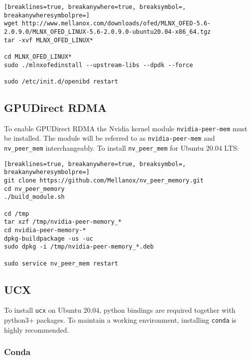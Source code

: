 \documentclass[a4paper,onecolumn]{article}
\begin{document}
\begin{Verbatim}[breaklines=true, breakanywhere=true, breaksymbol=, breakanywheresymbolpre=]
wget http://www.mellanox.com/downloads/ofed/MLNX_OFED-5.6-2.0.9.0/MLNX_OFED_LINUX-5.6-2.0.9.0-ubuntu20.04-x86_64.tgz
tar -xvf MLNX_OFED_LINUX*

cd MLNX_OFED_LINUX*
sudo ./mlnxofedinstall --upstream-libs --dpdk --force

sudo /etc/init.d/openibd restart
\end{Verbatim}

\subsection{GPUDirect RDMA}

To enable GPUDirect RDMA the Nvidia kernel module \verb|nvidia-peer-mem| must be installed. The module will be referred to as \verb|nvidia-peer-mem| and \verb|nv_peer_mem| interchangeably. To install \verb|nv_peer_mem| for Ubuntu 20.04 LTS:

\begin{Verbatim}[breaklines=true, breakanywhere=true, breaksymbol=, breakanywheresymbolpre=]
git clone https://github.com/Mellanox/nv_peer_memory.git
cd nv_peer_memory
./build_module.sh

cd /tmp
tar xzf /tmp/nvidia-peer-memory_*
cd nvidia-peer-memory-*
dpkg-buildpackage -us -uc
sudo dpkg -i /tmp/nvidia-peer-memory_*.deb

sudo service nv_peer_mem restart
\end{Verbatim}


\subsection{UCX}

To install \verb|ucx| on Ubuntu 20.04, python bindings are required together with python3+ packages. To maintain a working environment, installing \verb|conda| is highly recommended. 

\subsubsection{Conda}
\end{document}

